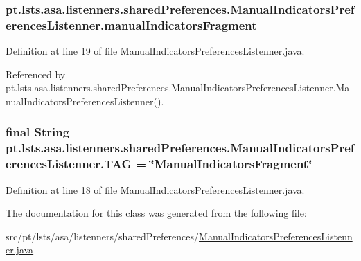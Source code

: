 \subsubsection[{manual\+Indicators\+Fragment}]{ pt.\+lsts.\+asa.\+listenners.\+shared\+Preferences.\+Manual\+Indicators\+Preferences\+Listenner.\+manual\+Indicators\+Fragment\hspace{0.3cm}{\ttfamily [private]}}\label{classpt_1_1lsts_1_1asa_1_1listenners_1_1sharedPreferences_1_1ManualIndicatorsPreferencesListenner_a692b57da2ec3941964c20b4c754a0f4f}


Definition at line 19 of file Manual\+Indicators\+Preferences\+Listenner.\+java.



Referenced by pt.\+lsts.\+asa.\+listenners.\+shared\+Preferences.\+Manual\+Indicators\+Preferences\+Listenner.\+Manual\+Indicators\+Preferences\+Listenner().

\hypertarget{classpt_1_1lsts_1_1asa_1_1listenners_1_1sharedPreferences_1_1ManualIndicatorsPreferencesListenner_a64c5d32962fb3999c7942632851dbf15}{}
\subsubsection[{T\+A\+G}]{\setlength{\rightskip}{0pt plus 5cm}final String pt.\+lsts.\+asa.\+listenners.\+shared\+Preferences.\+Manual\+Indicators\+Preferences\+Listenner.\+T\+A\+G = \char`\"{}Manual\+Indicators\+Fragment\char`\"{}\hspace{0.3cm}{\ttfamily [private]}}\label{classpt_1_1lsts_1_1asa_1_1listenners_1_1sharedPreferences_1_1ManualIndicatorsPreferencesListenner_a64c5d32962fb3999c7942632851dbf15}


Definition at line 18 of file Manual\+Indicators\+Preferences\+Listenner.\+java.



The documentation for this class was generated from the following file\+:\begin{DoxyCompactItemize}
\item 
src/pt/lsts/asa/listenners/shared\+Preferences/\hyperlink{ManualIndicatorsPreferencesListenner_8java}{Manual\+Indicators\+Preferences\+Listenner.\+java}\end{DoxyCompactItemize}
